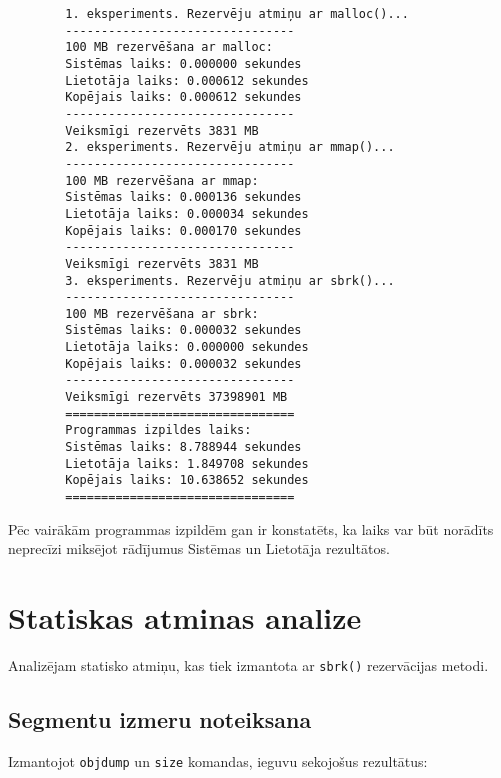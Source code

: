 \documentclass{report}
\begin{document}
	\begin{verbatim}
		1. eksperiments. Rezervēju atmiņu ar malloc()...
		--------------------------------
		100 MB rezervēšana ar malloc:
		Sistēmas laiks: 0.000000 sekundes
		Lietotāja laiks: 0.000612 sekundes
		Kopējais laiks: 0.000612 sekundes
		--------------------------------
		Veiksmīgi rezervēts 3831 MB
		2. eksperiments. Rezervēju atmiņu ar mmap()...
		--------------------------------
		100 MB rezervēšana ar mmap:
		Sistēmas laiks: 0.000136 sekundes
		Lietotāja laiks: 0.000034 sekundes
		Kopējais laiks: 0.000170 sekundes
		--------------------------------
		Veiksmīgi rezervēts 3831 MB
		3. eksperiments. Rezervēju atmiņu ar sbrk()...
		--------------------------------
		100 MB rezervēšana ar sbrk:
		Sistēmas laiks: 0.000032 sekundes
		Lietotāja laiks: 0.000000 sekundes
		Kopējais laiks: 0.000032 sekundes
		--------------------------------
		Veiksmīgi rezervēts 37398901 MB
		================================
		Programmas izpildes laiks:
		Sistēmas laiks: 8.788944 sekundes
		Lietotāja laiks: 1.849708 sekundes
		Kopējais laiks: 10.638652 sekundes
		================================
	\end{verbatim}
	
	Pēc vairākām programmas izpildēm gan ir konstatēts, ka laiks var būt norādīts neprecīzi miksējot rādījumus Sistēmas un Lietotāja rezultātos. 
	
	\section{Statiskas atminas analize}
	
	Analizējam statisko atmiņu, kas tiek izmantota ar \texttt{sbrk()} rezervācijas metodi.
	
	\subsection{Segmentu izmeru noteiksana}
	
	Izmantojot \texttt{objdump} un \texttt{size} komandas, ieguvu sekojošus rezultātus:
	
\end{document}
